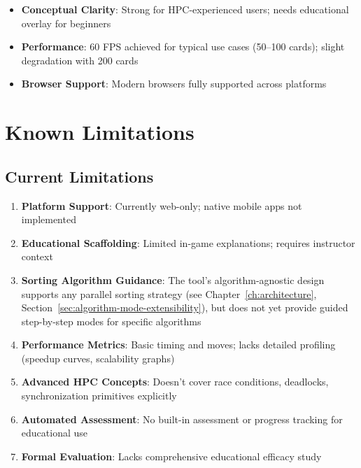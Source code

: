 \begin{itemize}
    \item \textbf{Conceptual Clarity}: Strong for HPC-experienced users; needs educational overlay for beginners
    \item \textbf{Performance}: 60 FPS achieved for typical use cases (50--100 cards); slight degradation with 200 cards
    \item \textbf{Browser Support}: Modern browsers fully supported across platforms
\end{itemize}

\section{Known Limitations}
\label{sec:limitations}

\subsection{Current Limitations}
\label{subsec:current-limitations}

\begin{enumerate}
    \item \textbf{Platform Support}: Currently web-only; native mobile apps not implemented

    \item \textbf{Educational Scaffolding}: Limited in-game explanations; requires instructor context

    \item \textbf{Sorting Algorithm Guidance}: The tool's algorithm-agnostic design supports any parallel sorting strategy (see Chapter~\ref{ch:architecture}, Section~\ref{sec:algorithm-mode-extensibility}), but does not yet provide guided step-by-step modes for specific algorithms

    \item \textbf{Performance Metrics}: Basic timing and moves; lacks detailed profiling (speedup curves, scalability graphs)

    \item \textbf{Advanced HPC Concepts}: Doesn't cover race conditions, deadlocks, synchronization primitives explicitly

    \item \textbf{Automated Assessment}: No built-in assessment or progress tracking for educational use

    \item \textbf{Formal Evaluation}: Lacks comprehensive educational efficacy study
\end{enumerate}

